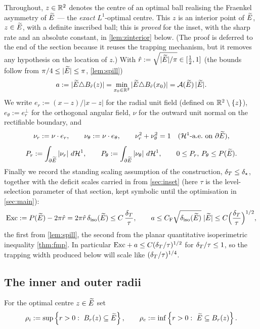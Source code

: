 Throughout, $z\in\mathbb{R}^2$ denotes the centre of an optimal ball realising the
Fraenkel asymmetry of $\widetilde{E}$ --- the \emph{exact} $L^1$-optimal centre.
This $z$ is an interior point of $\widetilde{E}$, $z\in\widetilde{E}$, with a definite
inscribed ball; this is \emph{proved} for the inset, with the sharp rate and
an absolute constant, in \cref{lem:zinterior} below. (The proof is deferred
to the end of the section because it reuses the trapping mechanism, but it
removes any hypothesis on the location of $z$.) With
$\hat r:=\sqrt{|\widetilde{E}|/\pi}\in[\tfrac12,1]$ (the bounds follow from
$\pi/4\le|\widetilde{E}|\le\pi$, \cref{lem:spill})
\begin{equation}\label{eq:a-def}
   a:=|\widetilde{E}\triangle B_{\hat r}(z)|
   =\min_{x_0\in\mathbb{R}^2}|\widetilde{E}\triangle B_{\hat r}(x_0)|
   =\mathcal{A}(\widetilde{E})\,|\widetilde{E}| .
\end{equation}
We write $e_r:=(x-z)/|x-z|$ for the radial unit field (defined on
$\mathbb{R}^2\setminus\left\{z\right\}$), $e_\theta:=e_r^{\perp}$ for the orthogonal angular
field, $\nu$ for the outward unit normal on the rectifiable boundary, and
\[
   \nu_r:=\nu\cdot e_r,\qquad
   \nu_\theta:=\nu\cdot e_\theta,\qquad
   \nu_r^2+\nu_\theta^2=1 \quad(\mathcal{H}^1\text{-a.e.\ on }\partial\widetilde{E}),
\]
\[
   P_r:=\int_{\partial\widetilde{E}}|\nu_r|\,\,d\mathcal{H}^1,
   \qquad
   P_\theta:=\int_{\partial\widetilde{E}}|\nu_\theta|\,\,d\mathcal{H}^1,
   \qquad
   0\le P_r,\,P_\theta\le P(\widetilde{E}).
\]
Finally we record the standing scaling assumption of the construction,
$\delta_T\le\delta_\star$, together with the deficit scales carried in from
\cref{sec:inset} (here $\tau$ is the level-selection parameter of that
section, kept symbolic until the optimisation in \cref{sec:main}):
\begin{equation}\label{eq:ann-scales}
   \mathrm{Exc}:=P(\widetilde{E})-2\pi\hat r=2\pi\hat r\,\delta_{\mathrm{iso}}(\widetilde{E})\le C\,\frac{\delta_T}{\tau},
   \qquad
   a\le C_{\mathrm F}\sqrt{\delta_{\mathrm{iso}}(\widetilde{E})}\;|\widetilde{E}|\le C\Bigl(\frac{\delta_T}{\tau}\Bigr)^{1/2},
\end{equation}
the first from \cref{lem:spill}, the second from the planar quantitative
isoperimetric inequality \cref{thm:fmp}. In particular $\mathrm{Exc}+a\le C(\delta_T/\tau)
^{1/2}$ for $\delta_T/\tau\le1$, so the trapping width produced below will scale
like $(\delta_T/\tau)^{1/4}$.

\subsection{The inner and outer radii}

\begin{definition}\label{def:radii}
For the optimal centre $z\in\widetilde{E}$ set
\begin{equation}\label{eq:radii-def}
   \rho_i:=\sup\left\{r>0:\ B_r(z)\subseteq\widetilde{E}\right\},
   \qquad
   \rho_e:=\inf\left\{r>0:\ \widetilde{E}\subseteq B_r(z)\right\} .
\end{equation}
\end{definition}

